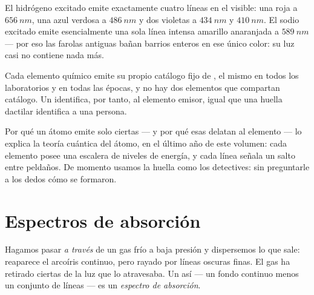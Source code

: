 \begin{example}\label{ex:g10:light-spectra:hydrogen}
El hidrógeno excitado emite exactamente cuatro líneas en el visible: una
roja a $\qty{656}{nm}$, una azul verdosa a $\qty{486}{nm}$ y dos
violetas a $\qty{434}{nm}$ y $\qty{410}{nm}$. El sodio excitado emite
esencialmente una sola línea intensa amarillo anaranjada a
$\qty{589}{nm}$ --- por eso las farolas antiguas bañan barrios enteros
en ese único color: su luz casi no contiene nada más.
\end{example}

\begin{proposition}\label{prop:g10:light-spectra:fingerprint}
Cada elemento químico emite su propio catálogo fijo de , el mismo en todos los laboratorios y en todas las épocas, y
no hay dos elementos que compartan catálogo. Un 
identifica, por tanto, al elemento emisor, igual que una huella dactilar
identifica a una persona.
\end{proposition}
\admitted

\begin{remark}\label{rem:g10:light-spectra:whylines}
Por qué un átomo emite solo ciertas  --- y por qué
esas  delatan al elemento --- lo explica la teoría
cuántica del átomo, en el último año de este volumen: cada elemento
posee una escalera de niveles de energía, y cada línea señala un salto
entre peldaños. De momento usamos la huella como los detectives: sin
preguntarle a los dedos cómo se formaron.
\end{remark}

\section{Espectros de absorción}

\begin{definition}\label{def:g10:light-spectra:absorption}
Hagamos pasar  \emph{a través} de un gas frío a baja presión y
dispersemos lo que sale: reaparece el arcoíris continuo, pero rayado por
líneas oscuras finas. El gas ha retirado ciertas  de
la luz que lo atravesaba. Un  así --- un fondo continuo menos un
conjunto de líneas --- es un \emph{espectro de
absorción}.
\end{definition}

